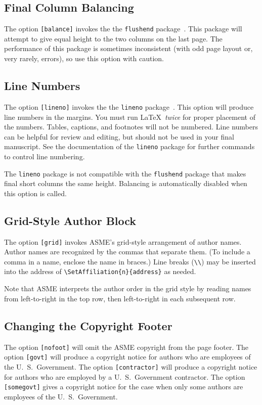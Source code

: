 \documentclass[captionpatch,colorlinks,upint,subscriptcorrection,varvw,mathalfa=cal=boondoxo,german]{asmeconf}
\begin{document}
\subsection{Final Column Balancing} The option \texttt{[balance]} invokes the the \texttt{flushend} package~\cite{tolusis}.
This package will attempt to give equal height to the two columns on the last page. The performance of this package is sometimes inconsistent (with odd page layout or, very rarely, errors), so use this option with caution.

\subsection{Line Numbers} The option \texttt{[lineno]} invokes the the \texttt{lineno} package~\cite{bottcher}. This option will produce line numbers in the margins. You must run \LaTeX\ \textit{twice} for proper placement of the numbers. Tables, captions, and footnotes will not be numbered.  Line numbers can be helpful for review and editing, but should not be used in your final manuscript. See the documentation of the \texttt{lineno} package for further commands to control line numbering. 

The \texttt{lineno} package is not compatible with the \texttt{flushend} package that makes final short columns the same height. Balancing is automatically disabled when this option is called. 

\subsection{Grid-Style Author Block} The option \texttt{[grid]} invokes ASME's grid-style arrangement of author names. Author names are recognized by the commas that separate them. (To include a comma in a name, enclose the name in braces.) Line breaks (\verb|\\|) may be inserted into the address of \verb|\SetAffiliation{n}{address}| as needed. 

Note that ASME interprets the author order in the grid style by reading names from left-to-right in the top row, then left-to-right in each subsequent row.

\subsection{Changing the Copyright Footer} The option \texttt{[nofoot]} will omit the ASME copyright from the page footer. The option \texttt{[govt]} will produce a copyright notice for authors who are employees of the U.\ S.\ Government.  
The option \texttt{[contractor]} will produce a copyright
notice for authors who are employed by a U.\ S.\ Government contractor.
The option \texttt{[somegovt]} gives a copyright notice for the case when only some authors are employees of the U.\ S.\ Government.
\end{document}

